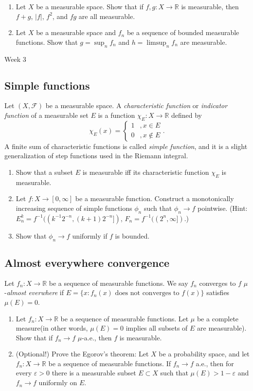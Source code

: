 \documentclass{article}
\def\R{\mathbb{R}}
\def\cF{\mathcal{F}}
\def\e{\varepsilon}
\begin{document}
\begin{enumerate}
\item Let $X$ be a measurable space. Show that if $f,g:X\to\R$ is measurable, then $f+g$, $|f|$, $f^2$, and $fg$ are all measurable.
\item Let $X$ be a measurable space and $f_n$ be a sequence of bounded measurable functions. Show that $g=\sup_nf_n$ and $h=\limsup_nf_n$ are measurable.
\end{enumerate}


\clearpage

Week 3

\subsection*{Simple functions}
Let $(X,\cF)$ be a measurable space.
A \emph{characteristic function} or \emph{indicator function} of a measurable set $E$ is a function $\chi_E:X\to\R$ defined by
\[\chi_E(x)=\begin{cases}1&,x\in E\\0&,x\notin E\end{cases}.\]
A finite sum of characteristic functions is called \emph{simple function}, and it is a slight generalization of step functions used in the Riemann integral.

\begin{enumerate}
\item Show that a subset $E$ is measurable iff its characteristic function $\chi_E$ is measurable.
\item Let $f:X\to[0,\infty]$ be a measurable function. Construct a monotonically increasing sequence of simple functions $\phi_n$ such that $\phi_n\to f$ pointwise. (Hint: $E_n^k=f^{-1}((k^{-1}2^{-n},(k+1)2^{-n}])$, $F_n=f^{-1}((2^n,\infty])$.)
\item Show that $\phi_n\to f$ uniformly if $f$ is bounded.
\end{enumerate}

\subsection*{Almost everywhere convergence}
Let $f_n:X\to\R$ be a sequence of measurable functions.
We say $f_n$ converges to $f$ $\mu$-\emph{almost everwhere} if $E=\{x:f_n(x)\text{ does not converges to }f(x)\}$ satisfies $\mu(E)=0$.

\begin{enumerate}
\item Let $f_n:X\to\R$ be a sequence of measurable functions. Let $\mu$ be a complete measure(in other words, $\mu(E)=0$ implies all subsets of $E$ are measurable). Show that if $f_n\to f$ $\mu$-a.e., then $f$ is measurable.
\item (Optional!) Prove the Egorov's theorem: Let $X$ be a probability space, and let $f_n:X\to\R$ be a sequence of measurable functions. If $f_n\to f$ a.e., then for every $\e>0$ there is a measurable subset $E\subset X$ such that $\mu(E)>1-\e$ and $f_n\to f$ uniformly on $E$.
\end{enumerate}
\end{document}
